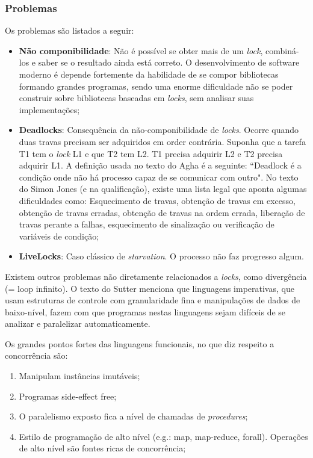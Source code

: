 \documentclass[]{article}
\begin{document}
	\subsubsection{Problemas}
		\par Os problemas são listados a seguir:
		\begin{itemize}
			\item \textbf{Não componibilidade}: Não é possível se obter mais de um \textit{lock}, combiná-los e saber
			se o resultado ainda está correto. O desenvolvimento de software moderno é depende fortemente da habilidade
			de se compor bibliotecas formando grandes programas, sendo uma enorme dificuldade não se poder construir
			sobre bibliotecas baseadas em \textit{locks}, sem analisar suas implementações;

			\item \textbf{Deadlocks}: Consequência da não-componibilidade de \textit{locks}. Ocorre quando duas travas
			precisam ser adquiridos em order contrária. Suponha que a tarefa T1 tem o \textit{lock} L1 e que T2 tem L2. 
			T1 precisa adquirir L2 e T2 precisa adquirir L1. A definição usada no texto do Agha é a seguinte: 
			``Deadlock é a condição onde não há processo capaz de se comunicar com outro". No texto do Simon Jones (e na
			qualificação), existe uma lista legal que aponta algumas dificuldades como: Esquecimento de travas,
			obtenção de travas em excesso, obtenção de travas erradas, obtenção de travas na ordem errada, liberação de
			travas perante a falhas, esquecimento de sinalização ou verificação de variáveis de condição;
			
			\item \textbf{LiveLocks}: Caso clássico de \textit{starvation}. O processo não faz progresso algum.
					
		\end{itemize}
	
		\par Existem outros problemas não diretamente relacionados a \textit{locks}, como divergência (= loop infinito).
		O texto do Sutter menciona que linguagens imperativas, que usam estruturas de controle com granularidade fina e
		manipulações de dados de baixo-nível, fazem com que programas nestas linguagens sejam difíceis de se analizar
		e paralelizar automaticamente.\\

		\par Os grandes pontos fortes das linguagens funcionais, no que diz respeito a concorrência são:
		\begin{enumerate}
			\item Manipulam instâncias imutáveis;
			\item Programas side-effect free;
			\item O paralelismo exposto fica a nível de chamadas de \textit{procedures};
			\item Estilo de programação de alto nível (e.g.: map, map-reduce, forall). Operações de alto nível são
			fontes ricas de concorrência;
		\end{enumerate}		
		
\end{document}
